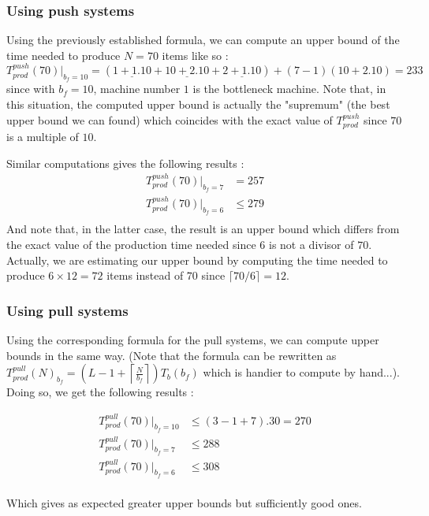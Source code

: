 \subsubsection{Using push systems}

Using the previously established formula, we can compute an upper bound of the time needed to produce $N=70$ items like so :
\[
    T_{prod}^{push}(70)|_{b_f = 10} = (\underline{1 + 1.10} + \underline{ 10 + 2.10 } + \underline{ 2 + 1.10 } ) + (7-1)(10 + 2.10) = 233
\] since with $b_f = 10$, machine number $1$ is the bottleneck machine. Note that, in this situation, the computed upper bound is actually the "supremum" (the best upper bound we can found) which coincides with the exact value of $T_{prod}^{push}$ since $70$ is a multiple of $10$. 

Similar computations gives the following results : 
\[
    \begin{split}
        T_{prod}^{push}(70)|_{b_f = 7} &= 257\\
        T_{prod}^{push}(70)|_{b_f = 6} &\le 279\\
    \end{split}
\]
And note that, in the latter case, the result is an upper bound which differs from the exact value of the production time needed since $6$ is not a divisor of $70$. Actually, we are estimating our upper bound by computing the time needed to produce $6\times 12 = 72$ items instead of $70$ since $\lceil 70 / 6 \rceil = 12$. 

\subsubsection{Using pull systems}

Using the corresponding formula for the pull systems, we can compute upper bounds in the same way. (Note that the formula can be rewritten as $T_{prod}^{pull}(N)_{b_f} = \left( L-1+\left\lceil \frac{N}{b_f} \right\rceil \right) T_b(b_f)$ which is handier to compute by hand...). Doing so, we get the following results : 

\[
    \begin{split}
        T_{prod}^{pull}(70)|_{b_f = 10} &\le (3 - 1 + 7).30 = 270\\
        T_{prod}^{pull}(70)|_{b_f = 7} &\le 288\\
        T_{prod}^{pull}(70)|_{b_f = 6} &\le 308\\
    \end{split}
\]

Which gives as expected greater upper bounds but sufficiently good ones.

